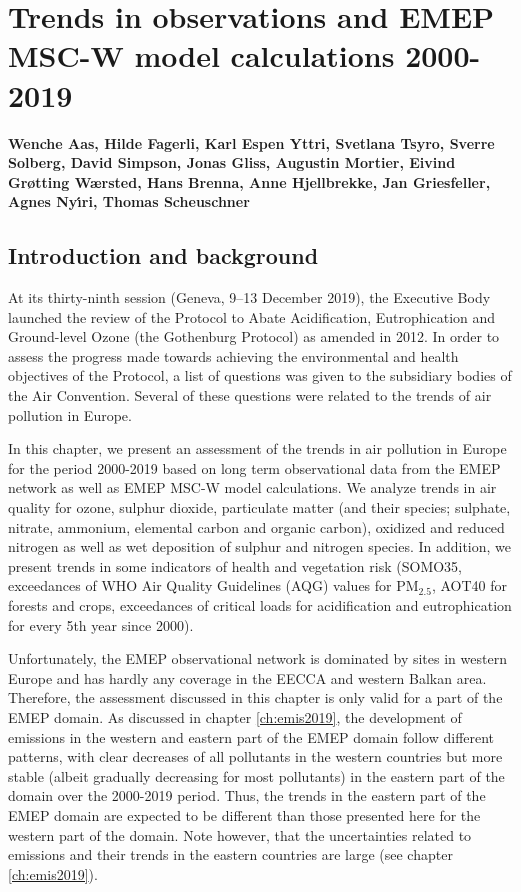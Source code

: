\chapter[Trends]{Trends in observations and EMEP MSC-W model calculations 2000-2019}
\label{ch:Trends}

{\bf{Wenche Aas, Hilde Fagerli, Karl Espen Yttri, Svetlana Tsyro, Sverre Solberg, David Simpson, Jonas Gliss, Augustin Mortier, Eivind Grøtting Wærsted, Hans Brenna, Anne Hjellbrekke, Jan Griesfeller, Agnes Ny\'{\i}ri, Thomas Scheuschner}}\\



\section{\label{sec:Trends_introduction}Introduction and background}
At its thirty-ninth session (Geneva, 9–13 December 2019), the Executive Body launched the review of the Protocol to Abate Acidification, Eutrophication and Ground-level Ozone (the Gothenburg Protocol) as amended in 2012. In order to assess  the progress made towards achieving the environmental and health objectives of the Protocol, a
list of questions was given to the subsidiary bodies of the Air Convention. Several of these questions were related to the trends of air pollution in Europe. 

In this chapter, we present an assessment of the trends in air pollution in Europe for the period 2000-2019 based on long term observational data from the EMEP network as well as EMEP MSC-W model calculations. We analyze trends in air quality for ozone, sulphur dioxide, particulate matter (and their species; sulphate, nitrate, ammonium, elemental carbon and organic carbon), oxidized and reduced nitrogen as well as wet deposition of sulphur and nitrogen species. In addition, we present trends in some indicators of health and vegetation risk (SOMO35, exceedances of WHO Air Quality Guidelines (AQG) values for PM$_{2.5}$, AOT40 for forests and crops, exceedances of critical loads for acidification and eutrophication for every 5th year since 2000).

Unfortunately, the EMEP observational network is dominated by sites in western Europe and has hardly any coverage in the EECCA and western Balkan area. Therefore, the assessment discussed in this chapter is only valid for a part of the EMEP domain. As discussed in chapter \ref{ch:emis2019}, the development of emissions in the western and eastern part of the EMEP domain follow different patterns, with clear decreases of all pollutants in the western countries  but more stable (albeit gradually decreasing for most pollutants) in the eastern part of the domain over the 2000-2019 period. Thus, the trends in the eastern part of the EMEP domain are expected to be different than those presented here for the western part of the domain. Note however, that the uncertainties related to emissions and their trends in the eastern countries are large (see chapter \ref{ch:emis2019}).


